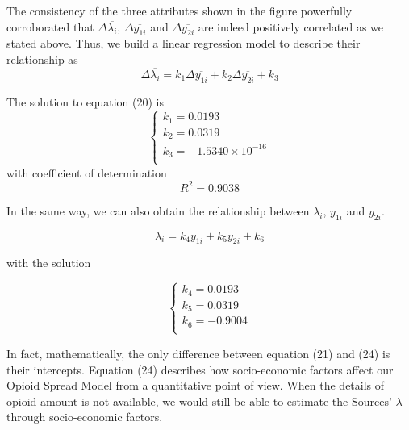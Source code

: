 The consistency of the three attributes shown in the figure powerfully corroborated that $\Delta \overline{\lambda_i}$, $\Delta \overline{y_{1i}}$ and  $\Delta \overline{y_{2i}}$ are indeed positively correlated as we stated above. Thus, we build a linear regression model to describe their relationship as
\begin{equation}
\Delta \overline{\lambda_i} = k_1 \Delta \overline{y_{1i}} + k_2 \Delta \overline{y_{2i}} + k_3
\end{equation}

The solution to equation (20) is
\begin{equation}
\left\{
\begin{array}{l}
k_1 = 0.0193 \\
k_2 = 0.0319 \\
k_3 = -1.5340 \times 10^{-16} \\
\end{array}
\right.
\end{equation}
with coefficient of determination
\begin{equation}
R^2 = 0.9038
\end{equation} 

In the same way, we can also obtain the relationship between $\lambda_i$, $y_{1i}$ and $y_{2i}$. 

\begin{equation}
\lambda_i = k_4 y_{1i}+ k_5 y_{2i} + k_6
\end{equation}

with the solution

\begin{equation}
\left\{
\begin{array}{l}
k_4 = 0.0193 \\
k_5 = 0.0319 \\
k_6 = -0.9004 \\
\end{array}
\right.
\end{equation}

In fact, mathematically, the only difference between equation (21) and (24) is their intercepts.
Equation (24) describes how socio-economic factors affect our Opioid Spread Model from a quantitative point of view. When the details of opioid amount is not available, we would still be able to estimate the Sources' $\lambda$ through socio-economic factors.


